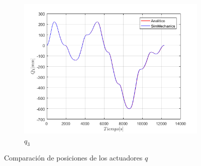 \begin{figure}
\begin{subfigure}{0.45\textwidth}
        \includegraphics[width=\linewidth]{Cap4_DisenoBasico/Figura/ComparativoSimMechanics/Q3.png}
        \caption{$q_3$}
    \end{subfigure}
    \caption{Comparación de posiciones de los actuadores $q$}
\end{figure}

